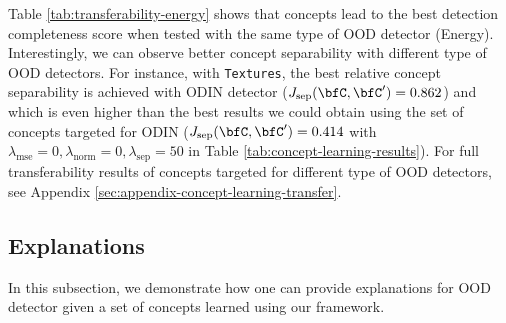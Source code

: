 Table \ref{tab:transferability-energy} shows that concepts lead to the best detection completeness score when tested with the same type of OOD detector (\ie Energy). 
Interestingly, we can observe better concept separability with different type of OOD detectors.
For instance, with \texttt{Textures}, the best relative concept separability is achieved with ODIN detector (\ie $J_\textrm{sep}(\bfC, \bfC') = 0.862$) and which is even higher than the best results we could obtain using the set of concepts targeted for ODIN (\ie $J_\textrm{sep}(\bfC, \bfC') = 0.414$ with $\lambda_\textrm{mse} = 0, \lambda_\textrm{norm} = 0, \lambda_\textrm{sep} = 50$ in Table \ref{tab:concept-learning-results}).
For full transferability results of concepts targeted for different type of OOD detectors, see Appendix \ref{sec:appendix-concept-learning-transfer}.

\subsection{Explanations}
In this subsection, we demonstrate how one can provide explanations for OOD detector given a set of concepts learned using our framework.

